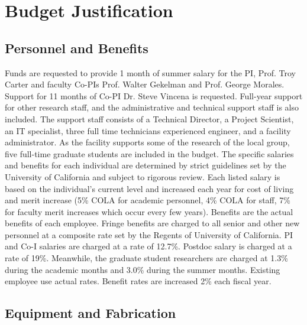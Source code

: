 \documentclass[11pt]{article}
\date{}
\begin{document}
\section*{Budget Justification}

\subsection*{Personnel and Benefits}

Funds are requested to provide 1 month of summer salary for the PI,
Prof. Troy Carter and faculty Co-PIs Prof. Walter Gekelman and
Prof. George Morales.  Support for 11 months of Co-PI Dr. Steve
Vincena is requested.  Full-year support for other research staff, and
the administrative and technical support staff is also included. The
support staff consists of a Technical Director, a Project Scientist,
an IT specialist, three full time technicians experienced engineer,
and a facility administrator. As the facility supports some of the
research of the local group, five full-time graduate students are
included in the budget.  The specific salaries and benefits for each
individual are determined by strict guidelines set by the University
of California and subject to rigorous review. Each listed salary is
based on the individual’s current level and increased each year for
cost of living and merit increase (5\% COLA for academic personnel,
4\% COLA for staff, 7\% for faculty merit increases which occur every
few years). Benefits are the actual benefits of each employee.  Fringe
benefits are charged to all senior and other new personnel at a
composite rate set by the Regents of University of California.  PI and
Co-I salaries are charged at a rate of 12.7\%. Postdoc salary is
charged at a rate of 19\%. Meanwhile, the graduate student researchers
are charged at 1.3\% during the academic months and 3.0\% during the
summer months.  Existing employee use actual rates.  Benefit rates are
increased 2\% each fiscal year.




\subsection*{Equipment and Fabrication}
\end{document}
